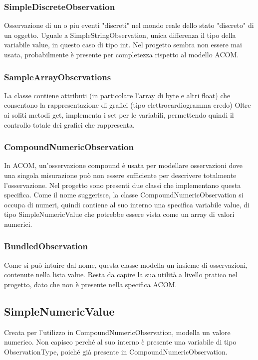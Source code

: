 \documentclass[a4paper]{article}
\begin{document}
        \subsubsection{SimpleDiscreteObservation}
            Osservazione di un o piu eventi "discreti" nel mondo reale dello stato "discreto" di un oggetto.
            Uguale a SimpleStringObservation, unica differenza il tipo della variabile value, in questo caso di tipo int.
            Nel progetto sembra non essere mai usata, probabilmente è presente per completezza rispetto al modello ACOM.
        \subsubsection{SampleArrayObservations}
            La classe contiene attributi (in particolare l'array di byte e altri float) che consentono la rappresentazione di grafici (tipo elettrocardiogramma credo)
            Oltre ai soliti metodi get, implementa i set per le variabili, permettendo quindi il controllo totale dei grafici che rappresenta.
        \subsubsection{CompoundNumericObservation}
            In ACOM, un'osservazione compound è usata per modellare osservazioni dove una singola misurazione può non essere sufficiente per
            descrivere totalmente l'osservazione.
            Nel progetto sono presenti due classi che implementano questa specifica.
            Come il nome suggerisce, la classe CompoundNumericObservation si occupa di numeri, quindi contiene al suo interno una specifica variabile value, di tipo SimpleNumericValue
            che potrebbe essere vista come un array di valori numerici.
        \subsubsection{BundledObservation}
            Come si può intuire dal nome, questa classe modella un insieme di osservazioni, contenute nella lista value.
            Resta da capire la sua utilità a livello pratico nel progetto, dato che non è presente nella specifica ACOM.
        \subsection{SimpleNumericValue}
            Creata per l'utilizzo in CompoundNumericObservation, modella un valore numerico. Non capisco perché al suo interno è presente
            una variabile di tipo ObservationType, poiché già presente in CompoundNumericObservation. 
\end{document}
